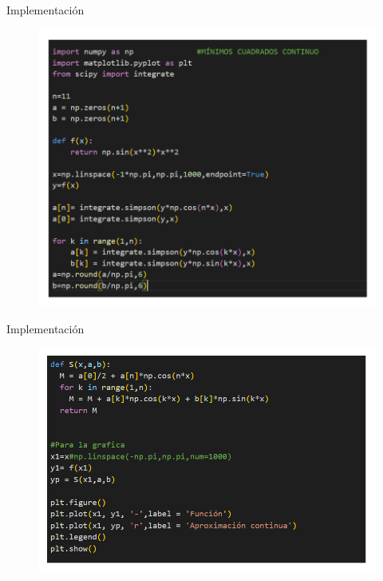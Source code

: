 \begin{frame}{Implementación}
    \begin{figure}
        \centering
        \includegraphics[width=.7\paperwidth]{p13-code1.png}
    \end{figure}
\end{frame}

\begin{frame}{Implementación}
    \begin{figure}
        \centering
        \includegraphics[width=.82\paperwidth]{p13-code2.png}
    \end{figure}
\end{frame}

